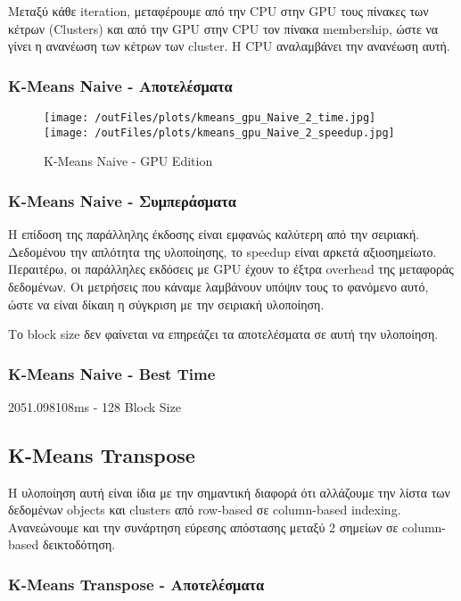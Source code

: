 \documentclass[../final_report.tex]{subfiles}
\begin{document}
Μεταξύ κάθε iteration, μεταφέρουμε από την CPU στην GPU τους πίνακες των κέτρων (Clusters) και από την GPU στην CPU τον πίνακα
membership, ώστε να γίνει η ανανέωση των κέτρων των cluster. Η CPU αναλαμβάνει την ανανέωση αυτή.

\subsubsection*{K-Means Naive - Αποτελέσματα}

\begin{figure}[H]
    \centering
    \texttt{[image: /outFiles/plots/kmeans\_gpu\_Naive\_2\_time.jpg]}
    \texttt{[image: /outFiles/plots/kmeans\_gpu\_Naive\_2\_speedup.jpg]}
    \caption{K-Means Naive - GPU Edition}
    \label{fig:K-Means Naive - GPU Edition}
\end{figure}

\subsubsection*{K-Means Naive - Συμπεράσματα}

Η επίδοση της παράλληλης έκδοσης είναι εμφανώς καλύτερη από την σειριακή. Δεδομένου την απλότητα της υλοποίησης, το speedup
είναι αρκετά αξιοσημείωτο. Περαιτέρω, οι παράλληλες εκδόσεις με GPU έχουν το έξτρα overhead της μεταφοράς δεδομένων. Οι μετρήσεις
που κάναμε λαμβάνουν υπόψιν τους το φανόμενο αυτό, ώστε να είναι δίκαιη η σύγκριση με την σειριακή υλοποίηση.

Το block size δεν φαίνεται να επηρεάζει τα αποτελέσματα σε αυτή την υλοποίηση. 


\subsubsection*{K-Means Naive - Best Time}

2051.098108ms - 128 Block Size

\subsection{K-Means Transpose}
Η υλοποίηση αυτή είναι ίδια με την σημαντική διαφορά ότι αλλάζουμε την λίστα των δεδομένων objects και clusters από row-based
σε column-based indexing. Ανανεώνουμε και την συνάρτηση εύρεσης απόστασης μεταξύ 2 σημείων σε column-based δεικτοδότηση.

\subsubsection*{K-Means Transpose - Αποτελέσματα}
\end{document}
